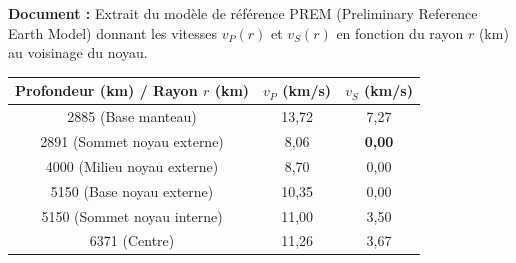 \documentclass[11pt]{article}
\begin{document}
\begin{exercice}
\textbf{Document :} Extrait du modèle de référence PREM (Preliminary Reference Earth Model) donnant les vitesses $v_P(r)$ et $v_S(r)$ en fonction du rayon $r$ (km) au voisinage du noyau.

\begin{center}
\begin{tabular}{|c|c|c|}\hline
Profondeur (km) / Rayon $r$ (km) & $v_P$ (km/s) & $v_S$ (km/s) \\ \hline
2885 (Base manteau) & 13,72 & 7,27 \\
2891 (Sommet noyau externe) & 8,06 & \textbf{0,00} \\
4000 (Milieu noyau externe) & 8,70 & 0,00 \\
5150 (Base noyau externe) & 10,35 & 0,00 \\
5150 (Sommet noyau interne) & 11,00 & 3,50 \\
6371 (Centre) & 11,26 & 3,67 \\ \hline
\end{tabular}
\end{center}


\end{exercice}
\end{document}
